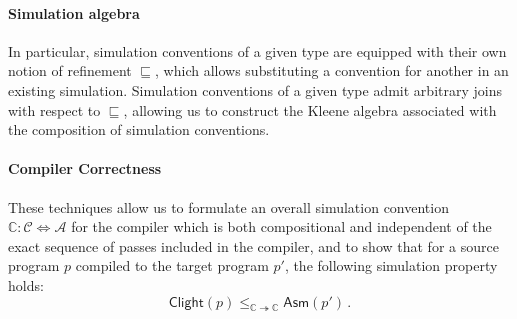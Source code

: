 \documentclass[sigplan,10pt,review,anonymous]{acmart}
\newcommand{\kw}[1]{\ensuremath{ \mathsf{#1} }}
\begin{document}
\paragraph{Simulation algebra} %

In particular,
simulation conventions of a given type
are equipped with their own notion of refinement $\sqsubseteq$,
which allows substituting
a convention for another in an existing simulation.
Simulation conventions of a given type
admit arbitrary joins with respect to $\sqsubseteq$,
allowing us to construct the Kleene algebra
associated with the composition of simulation conventions.


\paragraph{Compiler Correctness} \label{sec:compcert:overview} %

These techniques allow us to formulate an overall
simulation convention
$\mathbb{C} : \mathcal{C} \Leftrightarrow \mathcal{A}$
for the compiler which is both compositional
and independent of the exact sequence of passes
included in the compiler,
and to show that for a source program $p$
compiled to the target program $p'$,
the following simulation property holds:
\[
    \kw{Clight}(p)
    \le_{\mathbb{C} \twoheadrightarrow \mathbb{C}}
    \kw{Asm}(p') \,.
\]


\end{document}
